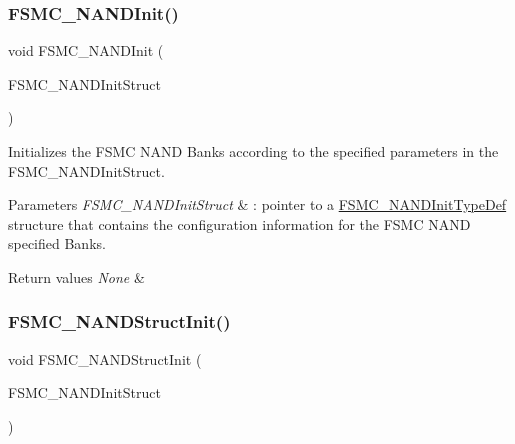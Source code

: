 \subsubsection{\texorpdfstring{FSMC\_NANDInit()}{FSMC\_NANDInit()}}
{\footnotesize\ttfamily void F\+S\+M\+C\+\_\+\+N\+A\+N\+D\+Init (\begin{DoxyParamCaption}\item[{\mbox{\hyperlink{struct_f_s_m_c___n_a_n_d_init_type_def}{F\+S\+M\+C\+\_\+\+N\+A\+N\+D\+Init\+Type\+Def}} $\ast$}]{F\+S\+M\+C\+\_\+\+N\+A\+N\+D\+Init\+Struct }\end{DoxyParamCaption})}



Initializes the F\+S\+MC N\+A\+ND Banks according to the specified parameters in the F\+S\+M\+C\+\_\+\+N\+A\+N\+D\+Init\+Struct. 


\begin{DoxyParams}{Parameters}
{\em F\+S\+M\+C\+\_\+\+N\+A\+N\+D\+Init\+Struct} & \+: pointer to a \mbox{\hyperlink{struct_f_s_m_c___n_a_n_d_init_type_def}{F\+S\+M\+C\+\_\+\+N\+A\+N\+D\+Init\+Type\+Def}} structure that contains the configuration information for the F\+S\+MC N\+A\+ND specified Banks.\\
\hline
\end{DoxyParams}

\begin{DoxyRetVals}{Return values}
{\em None} & \\
\hline
\end{DoxyRetVals}
\mbox{\label{group___f_s_m_c___private___functions_ga8283ad94ad8e83d49d5b77d1c7e17862}} 
\subsubsection{\texorpdfstring{FSMC\_NANDStructInit()}{FSMC\_NANDStructInit()}}
{\footnotesize\ttfamily void F\+S\+M\+C\+\_\+\+N\+A\+N\+D\+Struct\+Init (\begin{DoxyParamCaption}\item[{\mbox{\hyperlink{struct_f_s_m_c___n_a_n_d_init_type_def}{F\+S\+M\+C\+\_\+\+N\+A\+N\+D\+Init\+Type\+Def}} $\ast$}]{F\+S\+M\+C\+\_\+\+N\+A\+N\+D\+Init\+Struct }\end{DoxyParamCaption})}



